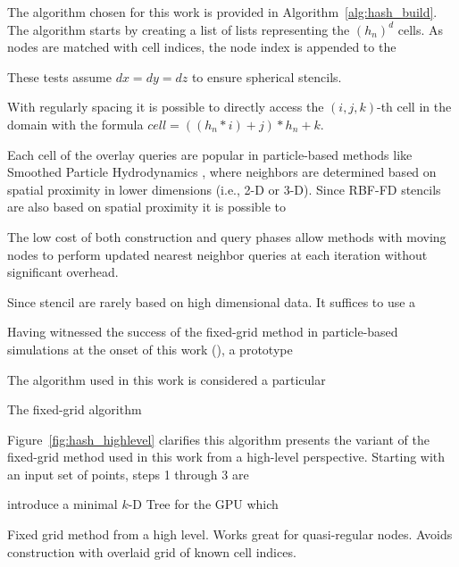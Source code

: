 \documentclass{report}
\begin{document}
The algorithm chosen for this work is provided in Algorithm~\ref{alg:hash_build}. The algorithm starts by creating a list of lists representing the $(h_n)^d$ cells. As nodes are matched with cell indices, the node index is appended to the 



These tests assume $dx = dy = dz$ to ensure spherical stencils. 

With regularly spacing it is possible to directly access the $(i,j,k)$-th cell in the domain with the formula $cell = ((h_n * i) + j) * h_n + k$.

 Each cell of the overlay  queries are popular in particle-based methods like Smoothed Particle Hydrodynamics \cite{Krog2010,Krog2010b}, where neighbors are determined based on spatial proximity in lower dimensions (i.e., 2-D or 3-D). Since RBF-FD stencils are also based on spatial proximity it is possible to 

 The low cost of both construction and query phases allow methods with moving nodes to perform updated nearest neighbor queries at each iteration without significant overhead. 

Since stencil are rarely based on high dimensional data. It suffices to use a 



Having witnessed the success of the fixed-grid method in particle-based simulations at the onset of this work (\cite{Krog2010,Krog2010b,Purcell2003}), a prototype 


The algorithm used in this work is considered a particular

The fixed-grid algorithm 

Figure~\ref{fig:hash_highlevel} clarifies this algorithm presents the variant of the fixed-grid method used in this work from a high-level perspective. Starting with an input set of points, steps 1 through 3 are 


\cite{Brown2010} introduce a minimal $k$-D Tree for the GPU which 

Fixed grid method from a high level. 
Works great for quasi-regular nodes. 
Avoids construction with overlaid grid of known cell indices. 
\end{document}
